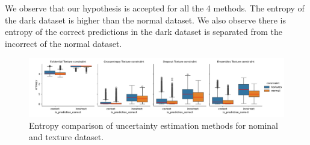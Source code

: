 
We observe that our hypothesis is accepted for all the 4 methods. The entropy of the dark dataset is higher than the normal dataset. We also observe there is entropy of the correct predictions in the dark dataset is separated from the incorrect of the normal dataset. 

\begin{figure}[t]
    \centering
    \includegraphics[width=\textwidth]{images/texture_boxplot.pdf}
    \caption{Entropy comparison of uncertainty estimation methods for nominal and texture dataset.}
    \label{fig:entropy_textures}
\end{figure}


